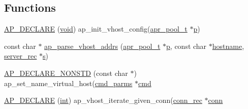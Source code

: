 \subsection*{Functions}
\begin{DoxyCompactItemize}
\item 
\hyperlink{group__APACHE__CORE__VHOST_ga4c847b0d794871e43cc8b2a1498981f9}{A\+P\+\_\+\+D\+E\+C\+L\+A\+RE} (\hyperlink{group__MOD__ISAPI_gacd6cdbf73df3d9eed42fa493d9b621a6}{void}) ap\+\_\+init\+\_\+vhost\+\_\+config(\hyperlink{structapr__pool__t}{apr\+\_\+pool\+\_\+t} $\ast$\hyperlink{group__APACHE__CORE__MPM_ga5cd91701e5c167f2b1a38e70ab57817e}{p})
\item 
const char $\ast$ \hyperlink{group__APACHE__CORE__VHOST_ga6fcf77850179edd28aaac9b0adaefa6a}{ap\+\_\+parse\+\_\+vhost\+\_\+addrs} (\hyperlink{structapr__pool__t}{apr\+\_\+pool\+\_\+t} $\ast$\hyperlink{group__APACHE__CORE__MPM_ga5cd91701e5c167f2b1a38e70ab57817e}{p}, const char $\ast$\hyperlink{ab_8c_af203df082d5c6dcaa0c88b07cf86466d}{hostname}, \hyperlink{structserver__rec}{server\+\_\+rec} $\ast$\hyperlink{pcretest_8txt_a062597889ba244b72877454b1d3adecf}{s})
\item 
\hyperlink{group__APACHE__CORE__VHOST_ga85feb7484b7a403444b74bbd03813815}{A\+P\+\_\+\+D\+E\+C\+L\+A\+R\+E\+\_\+\+N\+O\+N\+S\+TD} (const char $\ast$) ap\+\_\+set\+\_\+name\+\_\+virtual\+\_\+host(\hyperlink{group__APACHE__CORE__CONFIG_ga1791fbd28d06a9847bad001541c5241e}{cmd\+\_\+parms} $\ast$\hyperlink{group__apr__thread__proc_ga7b715f5a87a71c6766684c1798251237}{cmd}
\item 
\hyperlink{group__APACHE__CORE__VHOST_ga67d50b87071b57fce729eefe7a18773e}{A\+P\+\_\+\+D\+E\+C\+L\+A\+RE} (\hyperlink{pcre_8txt_a42dfa4ff673c82d8efe7144098fbc198}{int}) ap\+\_\+vhost\+\_\+iterate\+\_\+given\+\_\+conn(\hyperlink{structconn__rec}{conn\+\_\+rec} $\ast$\hyperlink{group__MOD__PROXY_gaf26a520a5f2c0d567cd7732f04c925c2}{conn}
\end{DoxyCompactItemize}

